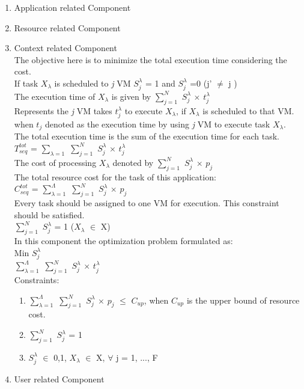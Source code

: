 \documentclass[a4paper]{article}
\begin{document}
\begin{enumerate}
\item Application related Component \\
\item Resource related Component \\
\item Context related Component \\
The objective here is to minimize the total execution time considering the cost. \\
If task $X_\lambda$ is scheduled to \textit{j} VM $S_j^\lambda$ = 1 and $S_j^\lambda$ =0 (j' $\neq$ j ) \\
The execution time of $X_\lambda$ is given by $\sum_{j=1}^N$ $S_j^\lambda$ $\times$ $t_j^\lambda$ \\
Represents the \textit{j} VM takes $t_j^\lambda$ to execute $X_\lambda$, if $X_\lambda$ is scheduled to that VM.
when $t_j$ denoted as the execution time by using \textit{j} VM to execute task $X_\lambda$.  \\
The total execution time is the sum of the execution time for each task. \\
$T_{seq}^{tot}$ = $\sum_{\lambda =1}$ $\sum_{j=1}^N$ $S_j^\lambda$ $\times$ $t_j^\lambda$ \\
The cost of processing $X_\lambda$ denoted by $\sum_{j=1}^N$ $S_j^\lambda$ $\times$ $p_j$\\
The total resource cost for the task of this application:\\ $C_{seq}^{tot}$ = $\sum_{\lambda =1}^\Lambda$ $\sum_{j=1}^N$ $S_j^\lambda$ $\times$ $p_j$\\
Every task should be assigned to one VM for execution. This constraint should be satisfied. \\
$\sum_{j=1}^N$ $S_j^\lambda$ = 1 ($X_\lambda$ $\in$ X) \\
In this component the optimization problem formulated as: \\
Min $S_j^\lambda$ \\
$\sum_{\lambda =1}^{\Lambda}$ $\sum_{j =1}^N$ $S_j^\lambda$ $\times$ $t_j^\lambda$ \\
Constraints: \\
\begin{enumerate}
\item $\sum_{\lambda = 1}^\Lambda$ $\sum_{j = 1}^N$  $S_j^\lambda$ $\times$ $p_j$ $\leq$ $C_{up}$, when $C_{up}$ is the upper bound of resource cost. 
\item $\sum_{j = 1}^N$ $S_j^\lambda$ = 1
\item $S_j^\lambda$ $\in$ {0,1}, $X_\lambda$ $\in$ X, $\forall$ j = 1, ..., F
\end{enumerate}
\item User related Component \\


\end{enumerate}
\end{document}

